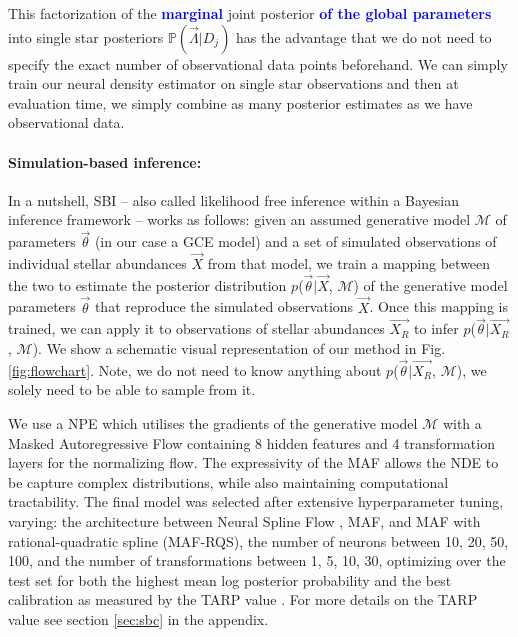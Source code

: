 \documentclass{aa}
\newcommand{\resub}[1]{\textbf{\textcolor{blue}{#1}}}
\begin{document}
This factorization of the \resub{marginal} joint posterior \resub{of the global parameters} into single star posteriors $\mathbb{P}(\vec\Lambda|D_j)$ has the advantage that we do not need to specify the exact number of observational data points beforehand. We can simply train our neural density estimator on single star observations and then at evaluation time, we simply combine as many posterior estimates as we have observational data.


\paragraph{Simulation-based inference:}
In a nutshell, SBI \citep[e.g.][]{Cranmer2020,Papamakarios:2021,Gloeckler2024AllinoneSI} -- also called likelihood free inference within a Bayesian inference framework -- works as follows: given an assumed generative model $\mathcal{M}$ of parameters $\Vec{\theta}$ (in our case a GCE model) and a set of simulated observations of individual stellar abundances $\Vec{X}$ from that model, we train a mapping between the two to estimate the posterior distribution $p$($\Vec{\theta}|\Vec{X}$, $\mathcal{M}$) of the generative model parameters $\Vec{\theta}$ that reproduce the simulated observations $\Vec{X}$. Once this mapping is trained, we can apply it to observations of stellar abundances $\Vec{X_R}$ to infer $p$($\Vec{\theta}|\Vec{X_R}$, $\mathcal{M}$). We show a schematic visual representation of our method in Fig. \ref{fig:flowchart}. Note, we do not need to know anything about $p$($\Vec{\theta}|\Vec{X_R}$, $\mathcal{M}$), we solely need to be able to sample from it.

We use a NPE \citep{zeghal2022neuralposteriorestimationdifferentiable} which utilises the gradients of the generative model $\mathcal{M}$ with a Masked Autoregressive Flow 
\citep[MAF;][]{papamakarios2018maskedautoregressiveflowdensity} 
containing 8 hidden features and 4 transformation layers for the normalizing flow. 
The expressivity of the MAF allows the NDE to be capture complex distributions, while also maintaining computational tractability. The final model was selected after extensive hyperparameter tuning, varying: the architecture between Neural Spline Flow \citep[NSF;][]{durkan2019neuralsplineflows}, MAF, and MAF with rational-quadratic spline (MAF-RQS), the number of neurons between {10, 20, 50, 100}, and the number of transformations between {1, 5, 10, 30}, optimizing over the test set for both the highest mean log posterior probability and the best calibration as measured by the TARP value \citep{Lemos2023}. For more details on the TARP value see section \ref{sec:sbc} in the appendix.
\end{document}
